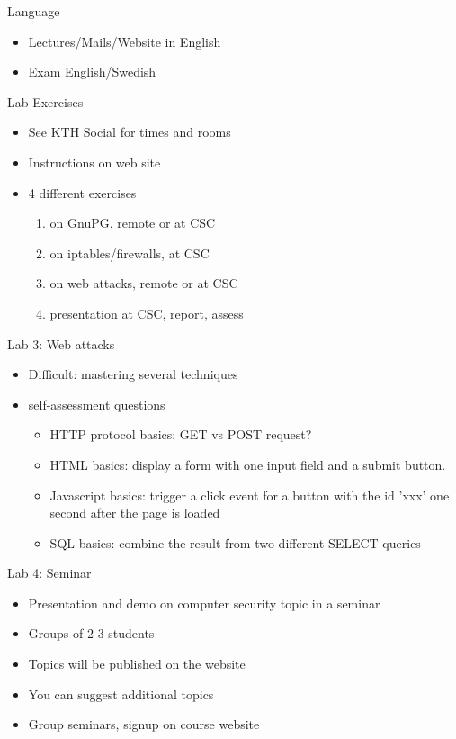 \documentclass{beamer}
\begin{document}
\begin{frame}{Language}
  \begin{itemize}
  \item Lectures/Mails/Website in English
  \item Exam English/Swedish
  \end{itemize}
\end{frame}

\begin{frame}{Lab Exercises}
  \begin{itemize}
    \item See KTH Social for times and rooms
    \item Instructions on web site
    \item 4 different exercises
      \begin{enumerate}
        \item on GnuPG, remote or at CSC
        \item on iptables/firewalls, at CSC
        \item on web attacks, remote or at CSC
        \item presentation at CSC, report, assess
      \end{enumerate}
  \end{itemize}
\end{frame}

\begin{frame}{Lab 3: Web attacks}
  \begin{itemize}
  \item Difficult: mastering several techniques
  \item self-assessment questions
    \begin{itemize}
      \item HTTP protocol basics: GET vs POST request?
      \item HTML basics: display a form with one input field and a
        submit button.
      \item Javascript basics: trigger a click event for a button with
        the id 'xxx' one second after the page is loaded
      \item SQL basics: combine the result from two different SELECT queries
    \end{itemize}
  \end{itemize}
\end{frame}

\begin{frame}{Lab 4: Seminar}
  \begin{itemize}
    \item Presentation and demo on computer security 
      topic in a seminar
    \item Groups of 2-3 students
    \item Topics will be published on the website
    \item You can suggest additional topics
    \item Group seminars, signup on course website
  \end{itemize}
\end{frame}
\end{document}
